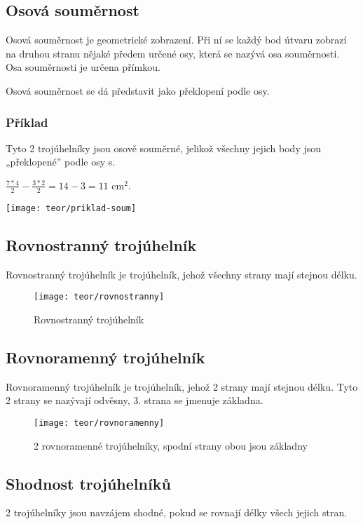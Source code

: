 \subsection{Osová souměrnost}

Osová souměrnost je geometrické zobrazení. Při ní se každý bod útvaru zobrazí na druhou stranu nějaké předem určené osy, která se nazývá osa souměrnosti. Osa souměrnosti je určena přímkou.

Osová souměrnost se dá představit jako překlopení podle osy.

\subsubsection{Příklad}
\begin{minipage}[t]{\linewidth}
    Tyto 2 trojúhelníky jsou osově souměrné, jelikož všechny jejich body jsou „překlopené” podle osy s.

    $ \frac{7*4}{2} - \frac{3*2}{2} =  14 - 3 = 11 \text{ cm}^{2}$.
    \begin{center}
        \texttt{[image: teor/priklad-soum]}
    \end{center}
\end{minipage}

\subsection{Rovnostranný trojúhelník}
Rovnostranný trojúhelník je trojúhelník, jehož všechny strany mají stejnou délku.

\begin{figure}[h]
    \caption{Rovnostranný trojúhelník}
    \centering
    \texttt{[image: teor/rovnostranny]}
\end{figure}

\subsection{Rovnoramenný trojúhelník}
Rovnoramenný trojúhelník je trojúhelník, jehož 2 strany mají stejnou délku. Tyto 2 strany se nazývají odvěsny, 3. strana se jmenuje základna.

\begin{figure}[h]
    \caption{2 rovnoramenné trojúhelníky, spodní strany obou jsou základny}
    \centering
    \texttt{[image: teor/rovnoramenny]}
\end{figure}

\subsection{Shodnost trojúhelníků}
2 trojúhelníky jsou navzájem shodné, pokud se rovnají délky všech jejich stran.

